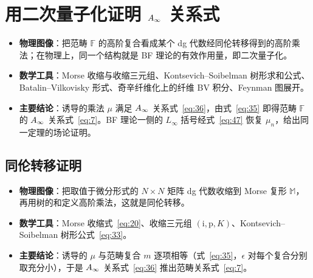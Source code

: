 
\section{用二次量子化证明 $A_\infty$ 关系式}\label{sec:3}

\begin{takeaway}
\begin{itemize}
  \item \textbf{物理图像}：把范畴 $\mathbb{F}$ 的高阶复合看成某个 dg 代数经同伦转移得到的高阶乘法；在物理上，同一个结构就是 BF 理论的有效作用量，即二次量子化。
  \item \textbf{数学工具}：Morse 收缩与收缩三元组、Kontsevich--Soibelman 树形求和公式、Batalin--Vilkovisky 形式、奇辛纤维化上的纤维 BV 积分、Feynman 图展开。
  \item \textbf{主要结论}：诱导的乘法 $\mu$ 满足 $A_\infty$ 关系式~\eqref{eq:36}，由式~\eqref{eq:35} 即得范畴 $\mathbb{F}$ 的 $A_\infty$ 关系式~\eqref{eq:7}。BF 理论一侧的 $L_\infty$ 括号经式~\eqref{eq:47} 恢复 $\mu_n$，给出同一定理的场论证明。
\end{itemize}
\end{takeaway}


\subsection{同伦转移证明}\label{sec:3.1}

\begin{takeaway}
\begin{itemize}
  \item \textbf{物理图像}：把取值于微分形式的 $N\times N$ 矩阵 dg 代数收缩到 Morse 复形 $\mathbb{M}$，再用树的和定义高阶乘法，这就是同伦转移。
  \item \textbf{数学工具}：Morse 收缩式~\eqref{eq:20}、收缩三元组 $(\mathrm{i},\mathrm{p},K)$、Kontsevich--Soibelman 树形公式~\eqref{eq:33}。
  \item \textbf{主要结论}：诱导的 $\mu$ 与范畴复合 $m$ 逐项相等（式~\eqref{eq:35}，$\epsilon$ 对每个复合分别取充分小），于是 $A_\infty$ 关系式~\eqref{eq:36} 推出范畴关系式~\eqref{eq:7}。
\end{itemize}
\end{takeaway}

